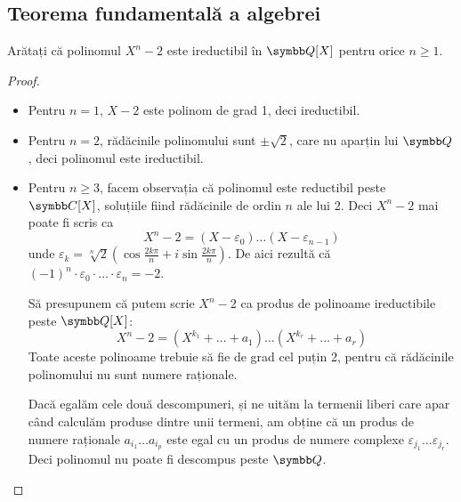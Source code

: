 \subsection{Teorema fundamentală a algebrei}

\begin{exercise}[3.7]
Arătați că polinomul \(X^n - 2\) este ireductibil în \(\rationals[X]\) pentru orice \(n \geq 1\).
\end{exercise}
\begin{proof}
~
\begin{itemize}
    \item Pentru \(n = 1\), \(X - 2\) este polinom de grad 1, deci ireductibil.
    
    \item Pentru \(n = 2\), rădăcinile polinomului sunt \(\pm \sqrt{2}\), care nu aparțin lui \(\rationals\), deci polinomul este ireductibil.
    
    \item Pentru \(n \geq 3\), facem observația că polinomul este reductibil peste \(\complex[X]\), soluțiile fiind rădăcinile de ordin \(n\) ale lui 2.
    Deci \(X^n - 2\) mai poate fi scris ca
    \[
        X^n - 2 = (X - \varepsilon_0) \dots (X - \varepsilon_{n - 1})
    \]
    unde \(\varepsilon_k = \sqrt[n]{2} (\cos \frac{2 k \pi}{n} + i \sin \frac{2 k \pi}{n})\). De aici rezultă că \((-1)^n \cdot \varepsilon_0 \cdot \dots \cdot \varepsilon_n = -2\).
    
    Să presupunem că putem scrie \(X^n - 2\) ca produs de polinoame ireductibile peste \(\rationals[X]\):
    \[
        X^n - 2 = (X^{k_1} + \dots + a_{1}) \dots (X^{k_r} + \dots + a_{r})
    \]
    Toate aceste polinoame trebuie să fie de grad cel puțin 2, pentru că rădăcinile polinomului nu sunt numere raționale. 
    
    Dacă egalăm cele două descompuneri, și ne uităm la termenii liberi care apar când calculăm produse dintre unii termeni, am obține că un produs de numere raționale \(a_{i_1} \dots a_{i_p}\) este egal cu un produs de numere complexe \(\varepsilon_{j_1} \dots \varepsilon_{j_r}\). Deci polinomul nu poate fi descompus peste \(\rationals\).
\end{itemize}
\end{proof}


